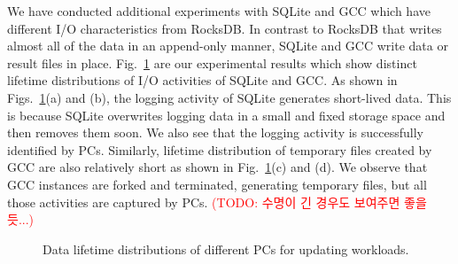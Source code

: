 We have conducted additional experiments with SQLite and GCC which have
different I/O characteristics from RocksDB. In contrast to RocksDB that writes
almost all of the data in an append-only manner, SQLite and GCC write data or
result files in place. Fig.~\ref{fig:updating_PCs} are our experimental results
which show distinct lifetime distributions of I/O activities of SQLite and GCC.
As shown in Figs.~\ref{fig:updating_PCs}(a) and (b), the logging activity of
SQLite generates short-lived data.  This is because SQLite overwrites logging
data in a small and fixed storage space and then removes them soon.  We also
see that the logging activity is successfully identified by PCs. Similarly,
lifetime distribution of temporary files created by GCC are also relatively
short as shown in Fig.~\ref{fig:updating_PCs}(c) and (d). We observe that GCC
instances are forked and terminated, generating temporary files, but all those
activities are captured by PCs. \textcolor{red}{(TODO: 수명이 긴 경우도
보여주면 좋을 듯...)}


\begin{figure}[t]
\centering
\hfill
	\hspace{2pt}
\hfill
\vspace{7pt}
	\hspace{2pt}
\caption{Data lifetime distributions of different PCs for updating workloads.} 
\label{fig:updating_PCs}
\end{figure}


